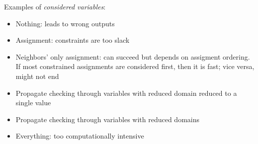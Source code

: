 \documentclass{article}
\begin{document}
Examples of \textit{considered variables}:
\begin{itemize}
  \item Nothing: leads to wrong outputs
  \item Assignment: constraints are too slack
  \item Neighbors' only assignment: can succeed but depends on
    assigment ordering. If most constrained assignments are
    considered first, then it is fast; vice versa, might not end
  \item Propagate checking through variables with reduced domain
    reduced to a single value
  \item Propagate checking through variables with reduced domains 
  \item Everything: too computationally intensive
\end{itemize}
\end{document}
